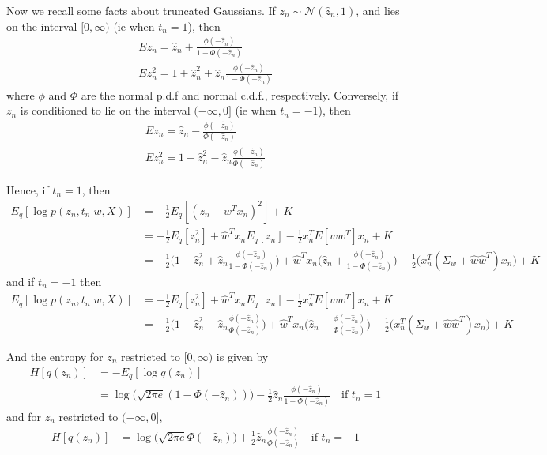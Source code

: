 \documentclass[10pt]{article}
\theoremstyle{plain}
\theoremstyle{definition}
\newcommand{\<}{\langle}
\renewcommand{\>}{\rangle}
\begin{document}
Now we recall some facts about truncated Gaussians. If $z_n\sim \mathcal N(\hat z_n, 1)$, and lies on the interval $[0,\infty)$ (ie when $t_n=1$), then 
\begin{align}
Ez_n = \hat z_n + \frac{\phi(-\hat z_n)}{1 - \Phi(-\hat z_n)}\\
Ez_n^2 = 1 + \hat z_n^2 + \hat z_n \frac{\phi(-\hat z_n)}{1 - \Phi(-\hat z_n)}
\end{align}
where $\phi$ and $\Phi$ are the normal p.d.f and normal c.d.f., respectively. Conversely, if $z_n$ is conditioned to lie on the interval $(-\infty, 0]$ (ie when $t_n=-1$), then 
\begin{align}
Ez_n = \hat z_n - \frac{\phi(-\hat z_n)}{\Phi(-\hat z_n)}\\
Ez_n^2 = 1 + \hat z_n^2 - \hat z_n \frac{\phi(-\hat z_n)}{\Phi(-\hat z_n)}
\end{align}

Hence, if $t_n = 1$, then 
\begin{align}
E_q[\log p(z_n,t_n|w,X)] &= -\frac{1}{2}E_q[(z_n - w^Tx_n)^2]  + K \\
	&=  -\frac{1}{2} E_q[z_n^2] + \hat w^Tx_n E_q[z_n] - \frac{1}{2} x_n^T E[ww^T]x_n + K \\
	&= -\frac{1}{2}\Big(1 + \hat z_n^2  + \hat z_n \frac{\phi(-\hat z_n)}{1 - \Phi(-\hat z_n)}\Big) + \hat w^Tx_n\Big(\hat z_n + \frac{\phi(-\hat z_n)}{1 - \Phi(-\hat z_n)}\Big) - \frac{1}{2} \Big(x_n^T(\Sigma_w + \hat w \hat w^T)x_n\Big) + K 
\end{align}
and if $t_n = -1$ then 
\begin{align}
E_q[\log p(z_n,t_n|w,X)] 
	&=  -\frac{1}{2} E_q[z_n^2] + \hat w^T x_n E_q[z_n] - \frac{1}{2} x_n^T E[ww^T]x_n + K \\
	&= -\frac{1}{2}\Big(1 + \hat z_n^2 - \hat z_n \frac{\phi(-\hat z_n)}{\Phi(-\hat z_n)}\Big)
	 + \hat w^T x_n\Big(\hat z_n - \frac{\phi(-\hat z_n)}{\Phi(-\hat z_n)}\Big)  
	  - \frac{1}{2} \Big(x_n^T(\Sigma_w + \hat w \hat w^T)x_n\Big)+ K 
\end{align}

And the entropy for $z_n$ restricted to $[0,\infty)$ is given by 
\begin{align}
H[q(z_n)] &= - E_q[\log q(z_n)] \\
	&= \log\Big(\sqrt{2\pi e} (1- \Phi(-\hat z_n))\Big) - \frac{1}{2}\hat z_n\frac{ \phi(-\hat z_n)}{1 - \Phi(-\hat z_n)} \quad \text{if } t_n = 1
\end{align}
and for $z_n$ restricted to $(-\infty,0]$, 
\begin{align}
H[q(z_n)] &= \log\Big(\sqrt{2\pi e} \Phi(-\hat z_n)\Big) + \frac{1}{2}\hat z_n\frac{ \phi(-\hat z_n)}{\Phi(-\hat z_n)} \quad \text{if } t_n = - 1
\end{align}
\end{document}

